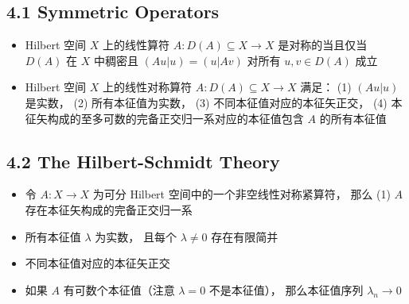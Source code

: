 
\subsection{4.1 Symmetric Operators}
\begin{itemize}
\item Hilbert 空间 $X$ 上的线性算符 $A:D(A)\subseteq X\to X$ 是对称的当且仅当 $D(A)$ 在 $X$ 中稠密且 $(Au|u) = (u|Av)$ 对所有 $u,v\in D(A)$ 成立

\item Hilbert 空间 $X$ 上的线性对称算符 $A:D(A)\subseteq X\to X$ 满足： (1) $(Au|u)$ 是实数， (2) 所有本征值为实数， (3) 不同本征值对应的本征矢正交， (4) 本征矢构成的至多可数的完备正交归一系对应的本征值包含 $A$ 的所有本征值
\end{itemize}


\subsection{4.2 The Hilbert-Schmidt Theory}
\begin{itemize}
\item 令 $A:X\to X$ 为可分 Hilbert 空间中的一个非空线性对称紧算符， 那么 (1) $A$ 存在本征矢构成的完备正交归一系

\item 所有本征值 $\lambda$ 为实数， 且每个 $\lambda\ne0$ 存在有限简并

\item 不同本征值对应的本征矢正交

\item 如果 $A$ 有可数个本征值（注意 $\lambda=0$ 不是本征值）， 那么本征值序列 $\lambda_n \to 0$
\end{itemize}
